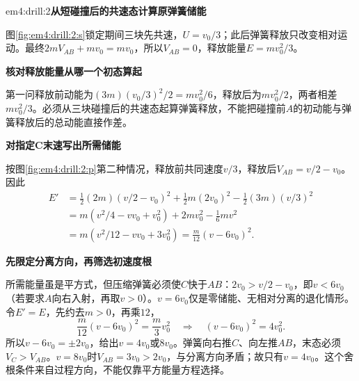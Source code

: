 \begin{drillsolution}{em4:drill:2}\textbf{从短碰撞后的共速态计算原弹簧储能}\par\nobreak
图\ref{fig:em4:drill:2:s}锁定期间三块先共速，$U=v_0/3$；此后弹簧释放只改变相对运动。最终$2mV_{AB}+mv_0=mv_0$，所以$V_{AB}=0$，释放能量$\boxed{E=mv_0^2/3}$。



\par\medskip{}\noindent\textbf{核对释放能量从哪一个初态算起}\par\nobreak
第一问释放前动能为$(3m)(v_0/3)^2/2=mv_0^2/6$，释放后为$mv_0^2/2$，两者相差$mv_0^2/3$。必须从三块碰撞后的共速态起算弹簧释放，不能把碰撞前$A$的初动能与弹簧释放后的总动能直接作差。



\par\medskip{}\noindent\textbf{对指定C末速写出所需储能}\par\nobreak
按图\ref{fig:em4:drill:2:p}第二种情况，释放前共同速度$v/3$，释放后$V_{AB}=v/2-v_0$。因此
\begin{align*}
E'&=\frac12(2m)(v/2-v_0)^2+\frac12m(2v_0)^2
-\frac12(3m)(v/3)^2\\
&=m(v^2/4-vv_0+v_0^2)+2mv_0^2-\frac16mv^2\\
&=m(v^2/12-vv_0+3v_0^2)
=\boxed{\frac m{12}(v-6v_0)^2}.
\end{align*}


\par\medskip{}\noindent\textbf{先限定分离方向，再筛选初速度根}\par\nobreak
所需能量虽是平方式，但压缩弹簧必须使$C$快于$AB$：$2v_0>v/2-v_0$，即$v<6v_0$（若要求$A$向右入射，再取$v>0$）。$v=6v_0$仅是零储能、无相对分离的退化情形。令$E'=E$，先约去$m>0$，再乘$12$，
\[
\frac m{12}(v-6v_0)^2=\frac m3v_0^2
\quad\Longrightarrow\quad
(v-6v_0)^2=4v_0^2.
\]
所以$v-6v_0=\pm2v_0$，给出$v=4v_0$或$8v_0$。弹簧向右推$C$、向左推$AB$，末态必须$V_C>V_{AB}$。$v=8v_0$时$V_{AB}=3v_0>2v_0$，与分离方向矛盾；故只有$\boxed{v=4v_0}$。这个舍根条件来自过程方向，不能仅靠平方能量方程选择。\end{drillsolution}
